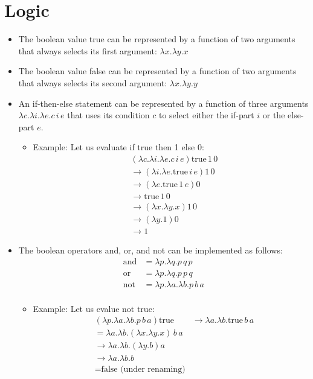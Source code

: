 \documentclass[]{article}
\begin{document}
\section{Logic}
\begin{itemize}
\item The boolean value true can be represented by a function of two arguments
that always selects its first argument: $\lambda x.\lambda y.x$
\item The boolean value false can be represented by a function of two arguments
that always selects its second argument: $\lambda x.\lambda y.y$
\item An if-then-else statement can be represented by a function of three
arguments $\lambda c.\lambda i.\lambda e.c\,i\,e$ that uses its condition $c$ to
select either the if-part $i$ or the else-part $e$.
\begin{itemize}
\item Example: Let us evaluate if true then 1 else 0:
\begin{align*}
&(\lambda c.\lambda i.\lambda e.c\,i\,e) \textrm{true}\,1\,0 \\
&\rightarrow(\lambda i.\lambda e.\textrm{true}\,i\,e)1\,0\\
&\rightarrow(\lambda e.\textrm{true}\,1\,e)0\\
&\rightarrow\textrm{true}\,1\,0\\
&\rightarrow(\lambda x.\lambda y.x)1\,0\\
&\rightarrow(\lambda y.1)0\\
&\rightarrow1
\end{align*}
\end{itemize}
\item The boolean operators and, or, and not can be implemented as follows:
\begin{align*}
\textrm{and} &= \lambda p.\lambda q.p\,q\,p\\
\textrm{or}  &= \lambda p.\lambda q.p\,p\,q\\
\textrm{not} &= \lambda p.\lambda a.\lambda b.p\,b\,a\\
\end{align*}
\begin{itemize}
\item Example: Let us evalue $\textrm{not true}$:
\begin{align*}
&(\lambda p.\lambda a.\lambda b.p\,b\,a)\textrm{true}
&\rightarrow \lambda a.\lambda b.\textrm{true}\,b\,a\\
&= \lambda a.\lambda b.(\lambda x.\lambda y.x)\,b\,a\\
&\rightarrow \lambda a.\lambda b.(\lambda y.b)a\\
&\rightarrow \lambda a.\lambda b.b\\
&= \textrm{false (under renaming)}
\end{align*}
\end{itemize}
\end{itemize}
\end{document}
